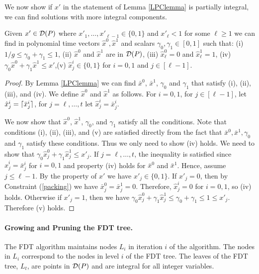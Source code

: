 We now show if $x'$ in the statement of Lemma \ref{LPClemma} is partially integral, we can find solutions with more integral components.
\begin{lemma}\label{round-up}
	Given $x'\in \operatorname{\mathcal{D}}(P)$ where $x'_1,\ldots,x'_{\ell-1}\in \{0,1\}$ and $x'_{\ell}<1$ for some $\ell\geq 1$ we can find in polynomial time vectors $\hat{x}^0,\hat{x}^1$ and scalars $\gamma_0,\gamma_1 \in [0,1]$ such that: (i) ${ 1}/{g}\leq \gamma_0 + \gamma_1  \leq 1$, (ii) $\hat{x}^0$ and $\hat{x}^1$ are in  $\operatorname{\mathcal{D}}( P)$, (iii) $\hat{x}^0_\ell=0$ and $\hat{x}^1_\ell=1$, (iv) $ \gamma_0\hat{x}^0 +\gamma_1 \hat{x}^1 \leq
	x'$,(v) $\hat{x}^i_j\in \{0,1\}$ for $i=0,1$ and $j\in[\ell-1]$.
\end{lemma} 
\begin{proof}
	By Lemma \ref{LPClemma} we can find $\bar{x}^0$, $\bar{x}^1$, $\gamma_0$ and $\gamma_1$ that satisfy (i), (ii), (iii), and (iv). We define $\hat{x}^0$ and $\hat{x}^1$ as follows. For $i=0,1$, for $j\in[\ell-1]$, let $\hat{x}^i_j= \lceil\bar{x}^i_j\rceil$, for $j=\ell,\ldots,t$ let $\hat{x}^i_j = \bar{x}^i_j$.
	
	
	We now show that $\hat{x}^0$, $\hat{x}^1$, $\gamma_0$, and $\gamma_1$ satisfy all the conditions. Note that conditions (i), (ii), (iii), and (v) are satisfied directly from the  fact that $\bar{x}^0,\bar{x}^1,\gamma_0$ and $\gamma_1$ satisfy these conditions. Thus we only need to show (iv) holds. We need to show that $\gamma_0 \hat{x}^0_j+\gamma_1\hat{x}^1_j\leq x'_j$. If $j=\ell,\ldots,t$, the inequality is satisfied since $\hat{x}^i_j = \bar{x}^i_j$ for $i=0,1$ and property (iv) holds for $\bar{x}^0$ and $\bar{x}^1$. Hence, assume $j\leq \ell-1$. By the property of $x'$ we have $x'_j\in \{0,1\}$. If $x'_j= 0$, then by Constraint (\ref{packing}) we have $\bar{x}^0_j = \bar{x}^1_j=0$. Therefore, $\hat{x}^i_j=0$ for $i=0,1$, so (iv) holds. Otherwise if $x'_j = 1$, then we have
	$\gamma_0\hat{x}^0_j+\gamma_1\hat{x}^1_j\leq \gamma_0+\gamma_1\leq 1\leq x'_j.$ 
	Therefore (v) holds.
\end{proof}

\paragraph{Growing and Pruning the FDT tree.} The FDT algorithm maintains nodes $L_i$ in iteration $i$ of the algorithm. The nodes in $L_i$ correspond to the nodes in level $i$ of the FDT tree. The leaves of the FDT tree, $L_t$, are points in $\operatorname{\mathcal{D}}(P)$ and are integral for all integer variables.


